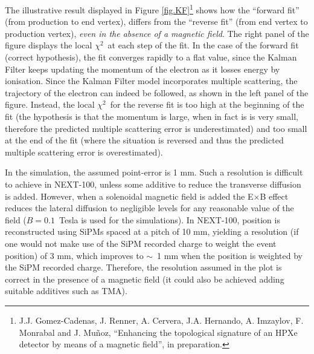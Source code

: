 The illustrative result displayed in Figure \ref{fig.KF}\footnote{J.J. Gomez-Cadenas, J. Renner, A. Cervera, J.A. Hernando, A. Imzaylov, F. Monrabal and J. Muñoz, ``Enhancing the topological signature of an HPXe detector by means of a magnetic field'', in preparation.} shows how the ``forward fit'' (from production to end vertex), differs from the ``reverse fit'' (from end vertex to production vertex), {\em even in the absence of a magnetic field}.  The right panel of the figure displays the local $\chi^2$~at each step of the fit. In the case of the forward fit (correct hypothesis), the fit converges rapidly to a flat value, since the Kalman Filter keeps updating the momentum of the electron as it losses energy by ionisation. Since the Kalman Filter model incorporates multiple scattering, the trajectory of the electron can indeed be followed, as shown in the left panel of the figure. Instead, the local $\chi^2$~for the reverse fit is too high at the beginning of the fit (the hypothesis is that the momentum is large, when in fact is is very small, therefore the predicted multiple scattering error is underestimated) and too small at the end of the fit (where the situation is reversed and thus the predicted multiple scattering error is overestimated).  

In the simulation, the assumed point-error is 1 mm. Such a resolution is difficult to achieve in NEXT-100, unless some additive to reduce the transverse diffusion is added. However, when a solenoidal magnetic field is added the E$\times$B effect reduces the lateral diffusion to negligible levels for any reasonable value of the field ($B=0.1$~Tesla is used for the simulations). In NEXT-100, position is reconstructed using SiPMs spaced at a pitch of 10 mm, yielding a resolution (if one would not make use of the SiPM recorded charge to weight the event position) of 3 mm, which improves to $\sim$~1 mm when the position is weighted by the SiPM recorded charge. Therefore, the resolution assumed in the plot is correct in the presence of a magnetic field (it could also be achieved adding suitable additives such as TMA). 

